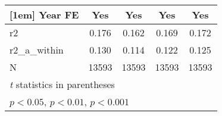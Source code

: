 {\begin{tabular}{l*{4}{c}}
[1em]
Year FE     &         Yes         &         Yes         &         Yes         &         Yes         \\
\hline
r2          &       0.176         &       0.162         &       0.169         &       0.172         \\
r2\_a\_within &       0.130         &       0.114         &       0.122         &       0.125         \\
N           &       13593         &       13593         &       13593         &       13593         \\
\hline\hline
\multicolumn{5}{l}{\footnotesize \textit{t} statistics in parentheses}\\
\multicolumn{5}{l}{\footnotesize \sym{*} \(p<0.05\), \sym{**} \(p<0.01\), \sym{***} \(p<0.001\)}\\
\end{tabular}
}
